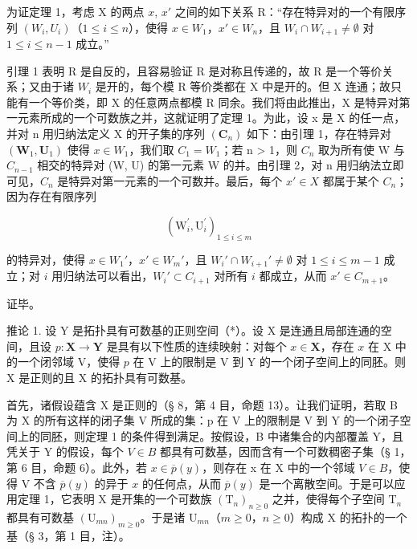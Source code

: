 为证定理 1，考虑 X 的两点 \(x\), \(x'\) 之间的如下关系 R：“存在特异对的一个有限序列 \((W_i, U_i)\)（\(1 \leqslant i \leqslant n\)），使得 \(x \in W_1\)，\(x' \in W_n\)，且 \(W_i \cap W_{i+1} \neq \emptyset\) 对 \(1 \leqslant i \leqslant n - 1\) 成立。”

引理 1 表明 R 是自反的，且容易验证 R 是对称且传递的，故 R 是一个等价关系；又由于诸 \(W_{i}\) 是开的，每个模 R 等价类都在 X 中是开的。但 X 连通；故只能有一个等价类，即 X 的任意两点都模 R 同余。我们将由此推出，X 是特异对第一元素所成的一个可数族之并，这就证明了定理 1。为此，设 x 是 X 的任一点，并对 n 用归纳法定义 X 的开子集的序列 \((\mathbf{C}_{n})\) 如下：由引理 1，存在特异对 \((\mathbf{W}_{1}, \mathbf{U}_{1})\) 使得 \(x \in W_{1}\)，我们取 \(C_{1} = W_{1}\)；若 n \textgreater{} 1，则 \(C_{n}\) 取为所有使 W 与 \(C_{n-1}\) 相交的特异对 (W, U) 的第一元素 W 的并。由引理 2，对 n 用归纳法立即可见，\(C_{n}\) 是特异对第一元素的一个可数并。最后，每个 \(x' \in X\) 都属于某个 \(C_{n}\)；因为存在有限序列

\[
\left(\mathrm{W} _ {i} ^ {\prime}, \mathrm{U} _ {i} ^ {\prime}\right) _ {1 \leqslant i \leqslant m}
\]

的特异对，使得 \(x \in W_1'\)，\(x' \in W_m'\)，且 \(W_i' \cap W_{i+1}' \neq \emptyset\) 对 \(1 \leqslant i \leqslant m - 1\) 成立；对 \(i\) 用归纳法可以看出，\(W_i' \subset C_{i+1}\) 对所有 \(i\) 都成立，从而 \(x' \in C_{m+1}\)。

证毕。

推论 1. 设 Y 是拓扑具有可数基的正则空间（*）。设 X 是连通且局部连通的空间，且设 \(p: \mathbf{X} \to \mathbf{Y}\) 是具有以下性质的连续映射：对每个 \(x \in \mathbf{X}\)，存在 \(x\) 在 X 中的一个闭邻域 V，使得 \(p\) 在 V 上的限制是 V 到 Y 的一个闭子空间上的同胚。则 X 是正则的且 X 的拓扑具有可数基。

首先，诸假设蕴含 X 是正则的（§ 8，第 4 目，命题 13）。让我们证明，若取 B 为 X 的所有这样的闭子集 V 所成的集：p 在 V 上的限制是 V 到 Y 的一个闭子空间上的同胚，则定理 1 的条件得到满足。按假设，B 中诸集合的内部覆盖 Y，且凭关于 Y 的假设，每个 \(V \in B\) 都具有可数基，因而含有一个可数稠密子集（§ 1，第 6 目，命题 6）。此外，若 \(x \in \overline{p}(y)\)，则存在 x 在 X 中的一个邻域 \(V \in B\)，使得 V 不含 \(\overline{p}(y)\) 的异于 \(x\) 的任何点，从而 \(\overline{p}(y)\) 是一个离散空间。于是可以应用定理 1，它表明 X 是开集的一个可数族 \((\mathrm{T}_n)_{n\geqslant 0}\) 之并，使得每个子空间 \(\mathrm{T}_n\) 都具有可数基 \((\mathrm{U}_{mn})_{m\geqslant 0}\)。于是诸 \(\mathrm{U}_{mn}\)（\(m\geqslant 0\)，\(n\geqslant 0\)）构成 X 的拓扑的一个基（§ 3，第 1 目，注）。

